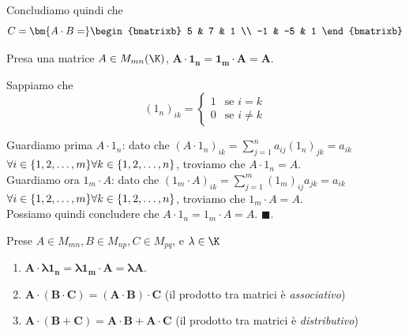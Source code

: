 \documentclass[11pt, a4paper, titlepage, oneside]{scrbook}
\begin{document}
Concludiamo quindi che
\[C = \bm{A \cdot B =}
\begin{bmatrixb}
5 & 7 & 1 \\
-1 & -5 & 1 
\end{bmatrixb}
\]

\begin{Osservazione}[]
\label{oss-matrice-per-matrice-unità}
Presa una matrice $A \in M_{mn}(\K)$, $\bm{A \cdot 1_n = 1_m \cdot A = A}$.
\end{Osservazione}

\Dimostrazione \nopagebreak

Sappiamo che 
\[
(1_n)_{ik} =
\begin{cases}
 1 & \text{se } i = k \\
 0 & \text{se } i \neq k
\end{cases}
\]

Guardiamo prima $A \cdot 1_n$: dato che $(A \cdot 1_n)_{ik} = \sum_{j=1}^n a_{ij}(1_n)_{jk} = a_{ik}$ $\forall i \in \{1,2,\ldots,m\} \\ \forall k \in \{1,2,\ldots,n\}$, troviamo che $A \cdot 1_n = A$. \\
Guardiamo ora $1_m \cdot A$: dato che $(1_m \cdot A)_{ik} = \sum_{j=1}^m (1_m)_{ij}a_{jk} = a_{ik}$ $\forall i \in \{1,2,\ldots,m\} \\ \forall k \in \{1,2,\ldots,n\}$, troviamo che $1_m \cdot A = A$. \\
Possiamo quindi concludere che $A \cdot 1_n = 1_m \cdot A = A$. $\blacksquare$.

\begin{Proprieta}
\label{prop-prodotto-matrici}
Prese $A \in M_{mn}, B \in M_{np}, C \in M_{pq}$, e $\lambda \in \K$
\begin{enumerate}
    \item $\bm{A \cdot \lambda 1_n = \lambda 1_m \cdot A = \lambda A }$.
    \item $\bm{A \cdot (B \cdot C) = (A \cdot B) \cdot C}$ (il prodotto tra matrici è \textit{associativo})
    \item $\bm{A \cdot (B + C) = A \cdot B + A \cdot C}$ (il prodotto tra matrici è \textit{distributivo})
\end{enumerate}
\end{Proprieta}

\Dimostrazione \nopagebreak
\end{document}
